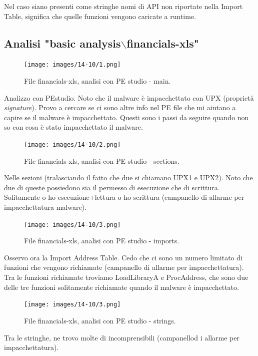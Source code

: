 \documentclass[a4paper]{book}
\begin{document}
Nel caso siano presenti come stringhe nomi di API non riportate nella Import Table, significa che quelle funzioni vengono caricate a runtime. 

\subsection{Analisi "basic analysis$\backslash$financials-xls"}

\begin{figure}[p]
    \texttt{[image: images/14-10/1.png]}
    \caption{File financials-xls, analisi con PE studio - main.}
\end{figure}

Analizzo con PEstudio. Noto che il malware è impacchettato con UPX (proprietà \textit{signature}). 
Provo a cercare se ci sono altre info nel PE file che mi aiutano a capire se il malware è impacchettato. Questi sono i passi da seguire quando non so con cosa è stato impacchettato il malware. 

\begin{figure}[p]
    \texttt{[image: images/14-10/2.png]}
    \caption{File financials-xls, analisi con PE studio - sections.}
\end{figure}

Nelle sezioni (tralasciando il fatto che due si chiamano UPX1 e UPX2). Noto che due di queste possiedono sia il permesso di esecuzione che di scrittura. Solitamente o ho esecuzione+lettura o ho scrittura (campanello di allarme per impacchettatura malware).

\begin{figure}[p]
    \texttt{[image: images/14-10/3.png]}
    \caption{File financials-xls, analisi con PE studio - imports.}
\end{figure}

Osservo ora la Import Address Table. Cedo che ci sono un numero limitato di funzioni che vengono richiamate (campanello di allarme per impacchettatura). Tra le funzioni richiamate troviamo LoadLibraryA e ProcAddress, che sono due delle tre funzioni solitamente richiamate quando il malware è impacchettato.

\begin{figure}[p]
    \texttt{[image: images/14-10/3.png]}
    \caption{File financials-xls, analisi con PE studio - strings.}
\end{figure}

Tra le stringhe, ne trovo molte di incomprensibili (campanellod i allarme per impacchettatura).
\end{document}
